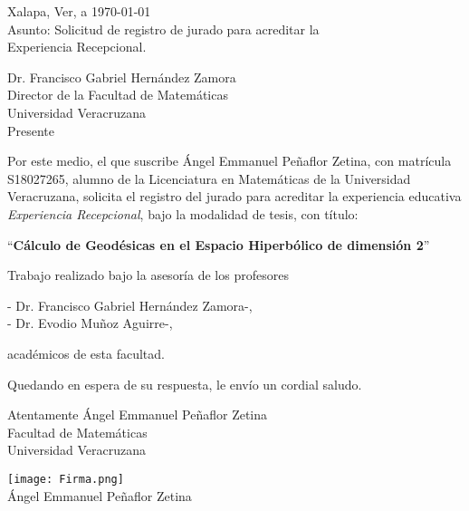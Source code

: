 \documentclass[
  12pt,
  letterpaper,
  spanish
]{letter}
\newcommand{\alumno}{Ángel Emmanuel Peñaflor Zetina}
\newcommand{\matricula}{S18027265}
\newcommand{\directorUno}{Francisco Gabriel Hernández Zamora}
\newcommand{\directorDos}{Evodio Muñoz Aguirre}
\newcommand{\titulo}{Cálculo de Geodésicas en el Espacio Hiperbólico de dimensión 2}
\newcommand{\universidad}{Universidad Veracruzana}
\newcommand{\facultad}{Facultad de Matemáticas}
\begin{document}
\thispagestyle{empty}
\begin{letter}

\begin{flushright}
  Xalapa, Ver, a \today \\ 
  Asunto: Solicitud de registro de jurado para acreditar la \\ Experiencia Recepcional.
\end{flushright}

\begin{flushleft}
  Dr. Francisco Gabriel Hernández Zamora\\
  Director de la \facultad \\
  \universidad \\
  Presente
\end{flushleft}

\vspace{12pt}

  Por este medio, el que suscribe \alumno, con matrícula \matricula, alumno de la Licenciatura en Matemáticas de la Universidad Veracruzana, solicita el registro del jurado para acreditar la experiencia educativa \textit{Experiencia Recepcional}, bajo la modalidad de tesis, con título:

\begin{center}
  \enquote{\textbf{\titulo}}
\end{center}

  Trabajo realizado bajo la asesoría de los profesores

\begin{center}
  - Dr. \directorUno \phantom{ }-, \\
  - Dr. \directorDos \phantom{ }-,
\end{center}
académicos de esta facultad.

\vspace{12pt}

  Quedando en espera de su respuesta, le envío un cordial saludo.

    \vspace{24pt}

\begin{flushleft}
  Atentamente
  \alumno\\
  \facultad\\
  \universidad\\
\end{flushleft}

\vspace{60pt}

\begin{multicols}{3}
\begin{center}
  \texttt{[image: Firma.png]}\\
  \alumno
\end{center}


\end{multicols}
\end{letter}
\end{document}
